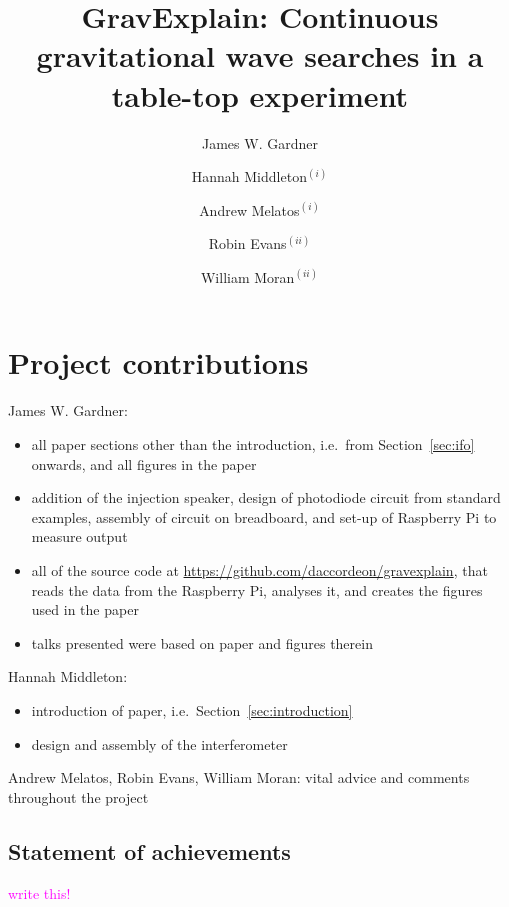 \documentclass[prb,preprint]{revtex4-1}
\newcommand{\jam}{\textcolor{magenta}}
\begin{document}
\section*{Project contributions}
James W. Gardner:
\begin{itemize}
\item all paper sections other than the introduction, i.e.\ from Section~\ref{sec:ifo} onwards, and all figures in the paper
\item addition of the injection speaker, design of photodiode circuit from standard examples, assembly of circuit on breadboard, and set-up of Raspberry Pi to measure output
\item all of the source code at \url{https://github.com/daccordeon/gravexplain}, that reads the data from the Raspberry Pi, analyses it, and creates the figures used in the paper
\item talks presented were based on paper and figures therein
\end{itemize}

Hannah Middleton:
\begin{itemize}
\item introduction of paper, i.e.\ Section~\ref{sec:introduction}
\item design and assembly of the interferometer
\end{itemize}

Andrew Melatos, Robin Evans, William Moran: vital advice and comments throughout the project

\subsection*{Statement of achievements}

\jam{write this!}

\newpage

\title{GravExplain: Continuous gravitational wave searches in a table-top experiment}

\author{James W. Gardner}

\author{Hannah Middleton$^{(i)}$}
\author{Andrew Melatos$^{(i)}$}
\author{Robin Evans$^{(ii)}$}
\author{William Moran$^{(ii)}$}
\end{document}
